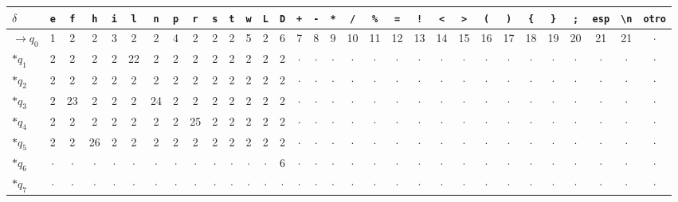 \begin{longtable}{@{}l|*{30}{c}@{}}
\toprule
$\delta$ & \texttt{e} & \texttt{f} & \texttt{h} & \texttt{i} & \texttt{l} & \texttt{n} & \texttt{p} & \texttt{r} & \texttt{s} & \texttt{t} & \texttt{w} & \texttt{L} & \texttt{D} & \texttt{+} & \texttt{-} & \texttt{*} & \texttt{/} & \texttt{\%} & \texttt{=} & \texttt{!} & \texttt{<} & \texttt{>} & \texttt{(} & \texttt{)} & \texttt{\{} & \texttt{\}} & \texttt{;} & \texttt{esp} & \texttt{\textbackslash{}n} & \texttt{otro} \\
\midrule
\endhead
\bottomrule
\endfoot
$\rightarrow$$q_{0}$ & 1 & 2 & 2 & 3 & 2 & 2 & 4 & 2 & 2 & 2 & 5 & 2 & 6 & 7 & 8 & 9 & 10 & 11 & 12 & 13 & 14 & 15 & 16 & 17 & 18 & 19 & 20 & 21 & 21 & $\cdot$ \\
$\ast$$q_{1}$ & 2 & 2 & 2 & 2 & 22 & 2 & 2 & 2 & 2 & 2 & 2 & 2 & 2 & $\cdot$ & $\cdot$ & $\cdot$ & $\cdot$ & $\cdot$ & $\cdot$ & $\cdot$ & $\cdot$ & $\cdot$ & $\cdot$ & $\cdot$ & $\cdot$ & $\cdot$ & $\cdot$ & $\cdot$ & $\cdot$ & $\cdot$ \\
$\ast$$q_{2}$ & 2 & 2 & 2 & 2 & 2 & 2 & 2 & 2 & 2 & 2 & 2 & 2 & 2 & $\cdot$ & $\cdot$ & $\cdot$ & $\cdot$ & $\cdot$ & $\cdot$ & $\cdot$ & $\cdot$ & $\cdot$ & $\cdot$ & $\cdot$ & $\cdot$ & $\cdot$ & $\cdot$ & $\cdot$ & $\cdot$ & $\cdot$ \\
$\ast$$q_{3}$ & 2 & 23 & 2 & 2 & 2 & 24 & 2 & 2 & 2 & 2 & 2 & 2 & 2 & $\cdot$ & $\cdot$ & $\cdot$ & $\cdot$ & $\cdot$ & $\cdot$ & $\cdot$ & $\cdot$ & $\cdot$ & $\cdot$ & $\cdot$ & $\cdot$ & $\cdot$ & $\cdot$ & $\cdot$ & $\cdot$ & $\cdot$ \\
$\ast$$q_{4}$ & 2 & 2 & 2 & 2 & 2 & 2 & 2 & 25 & 2 & 2 & 2 & 2 & 2 & $\cdot$ & $\cdot$ & $\cdot$ & $\cdot$ & $\cdot$ & $\cdot$ & $\cdot$ & $\cdot$ & $\cdot$ & $\cdot$ & $\cdot$ & $\cdot$ & $\cdot$ & $\cdot$ & $\cdot$ & $\cdot$ & $\cdot$ \\
$\ast$$q_{5}$ & 2 & 2 & 26 & 2 & 2 & 2 & 2 & 2 & 2 & 2 & 2 & 2 & 2 & $\cdot$ & $\cdot$ & $\cdot$ & $\cdot$ & $\cdot$ & $\cdot$ & $\cdot$ & $\cdot$ & $\cdot$ & $\cdot$ & $\cdot$ & $\cdot$ & $\cdot$ & $\cdot$ & $\cdot$ & $\cdot$ & $\cdot$ \\
$\ast$$q_{6}$ & $\cdot$ & $\cdot$ & $\cdot$ & $\cdot$ & $\cdot$ & $\cdot$ & $\cdot$ & $\cdot$ & $\cdot$ & $\cdot$ & $\cdot$ & $\cdot$ & 6 & $\cdot$ & $\cdot$ & $\cdot$ & $\cdot$ & $\cdot$ & $\cdot$ & $\cdot$ & $\cdot$ & $\cdot$ & $\cdot$ & $\cdot$ & $\cdot$ & $\cdot$ & $\cdot$ & $\cdot$ & $\cdot$ & $\cdot$ \\
$\ast$$q_{7}$ & $\cdot$ & $\cdot$ & $\cdot$ & $\cdot$ & $\cdot$ & $\cdot$ & $\cdot$ & $\cdot$ & $\cdot$ & $\cdot$ & $\cdot$ & $\cdot$ & $\cdot$ & $\cdot$ & $\cdot$ & $\cdot$ & $\cdot$ & $\cdot$ & $\cdot$ & $\cdot$ & $\cdot$ & $\cdot$ & $\cdot$ & $\cdot$ & $\cdot$ & $\cdot$ & $\cdot$ & $\cdot$ & $\cdot$ & $\cdot$ \\

\end{longtable}
